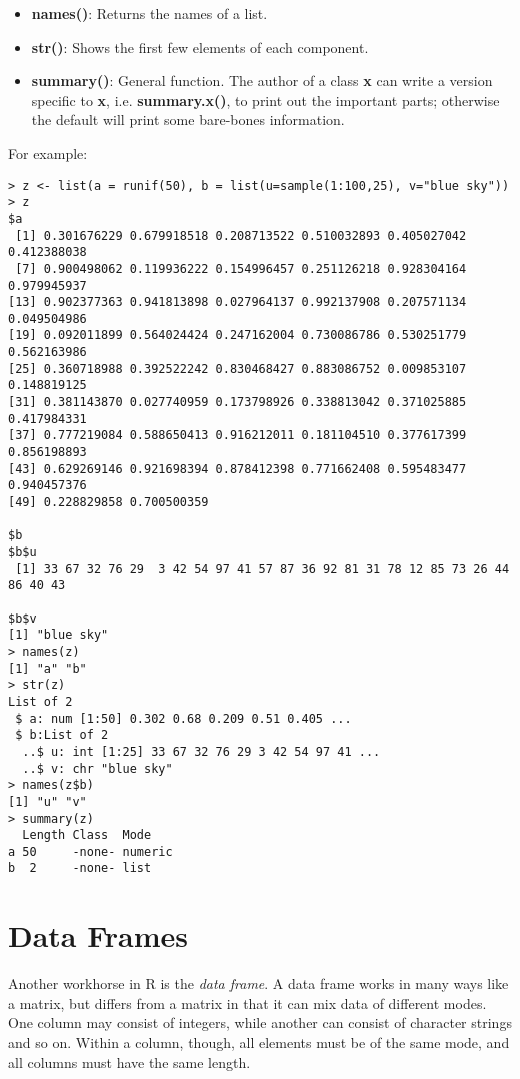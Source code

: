 \begin{itemize}

\item {\bf names()}:  Returns the names of a list.

\item {\bf str()}:  Shows the first few elements of each component.

\item {\bf summary()}:  General function.  The author of a class {\bf
x} can write a version specific to {\bf x}, i.e. {\bf summary.x()}, to
print out the important parts; otherwise the default will print some
bare-bones information.

\end{itemize}

For example:

\begin{lstlisting}
> z <- list(a = runif(50), b = list(u=sample(1:100,25), v="blue sky"))
> z
$a
 [1] 0.301676229 0.679918518 0.208713522 0.510032893 0.405027042
0.412388038
 [7] 0.900498062 0.119936222 0.154996457 0.251126218 0.928304164
0.979945937
[13] 0.902377363 0.941813898 0.027964137 0.992137908 0.207571134
0.049504986
[19] 0.092011899 0.564024424 0.247162004 0.730086786 0.530251779
0.562163986
[25] 0.360718988 0.392522242 0.830468427 0.883086752 0.009853107
0.148819125
[31] 0.381143870 0.027740959 0.173798926 0.338813042 0.371025885
0.417984331
[37] 0.777219084 0.588650413 0.916212011 0.181104510 0.377617399
0.856198893
[43] 0.629269146 0.921698394 0.878412398 0.771662408 0.595483477
0.940457376
[49] 0.228829858 0.700500359

$b
$b$u
 [1] 33 67 32 76 29  3 42 54 97 41 57 87 36 92 81 31 78 12 85 73 26 44
86 40 43

$b$v
[1] "blue sky"
> names(z)
[1] "a" "b"
> str(z)
List of 2
 $ a: num [1:50] 0.302 0.68 0.209 0.51 0.405 ...
 $ b:List of 2
  ..$ u: int [1:25] 33 67 32 76 29 3 42 54 97 41 ...
  ..$ v: chr "blue sky"
> names(z$b)
[1] "u" "v"
> summary(z)
  Length Class  Mode   
a 50     -none- numeric
b  2     -none- list   
\end{lstlisting}

\section{Data Frames}

Another workhorse in R is the {\it data frame}.  A data frame works in
many ways like a matrix, but differs from a matrix in that it can mix
data of different modes.  One column may consist of integers, while
another can consist of character strings and so on.  Within a column,
though, all elements must be of the same mode, and all columns must have
the same length.

